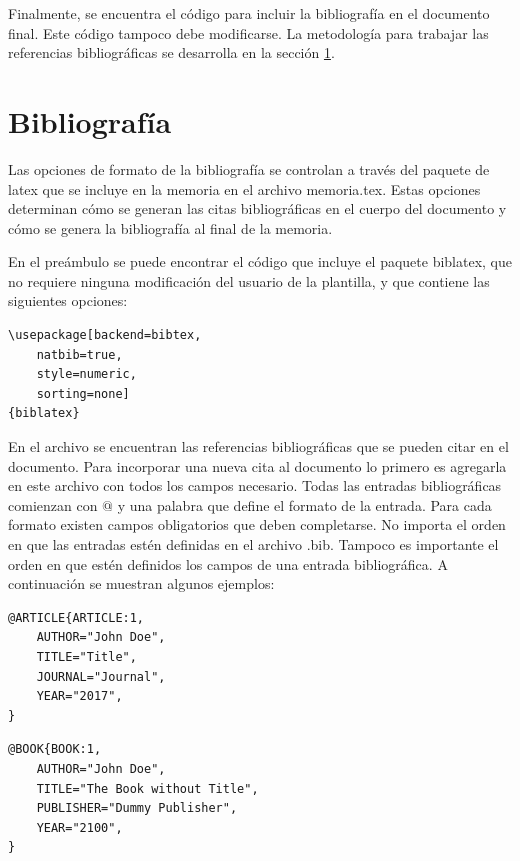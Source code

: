 Finalmente, se encuentra el código para incluir la bibliografía en el documento final.  Este código tampoco debe modificarse. La metodología para trabajar las referencias bibliográficas se desarrolla en la sección \ref{sec:biblio}.

\section{Bibliografía}
\label{sec:biblio}

Las opciones de formato de la bibliografía se controlan a través del paquete de latex  que se incluye en la memoria en el archivo memoria.tex.  Estas opciones determinan cómo se generan las citas bibliográficas en el cuerpo del documento y cómo se genera la bibliografía al final de la memoria.

En el preámbulo se puede encontrar el código que incluye el paquete biblatex, que no requiere ninguna modificación del usuario de la plantilla, y que contiene las siguientes opciones:

\begin{lstlisting}
\usepackage[backend=bibtex,
	natbib=true, 
	style=numeric, 
	sorting=none]
{biblatex}
\end{lstlisting}

En el archivo  se encuentran las referencias bibliográficas que se pueden citar en el documento.  Para incorporar una nueva cita al documento lo primero es agregarla en este archivo con todos los campos necesario.  Todas las entradas bibliográficas comienzan con $@$ y una palabra que define el formato de la entrada.  Para cada formato existen campos obligatorios que deben completarse. No importa el orden en que las entradas estén definidas en el archivo .bib.  Tampoco es importante el orden en que estén definidos los campos de una entrada bibliográfica. A continuación se muestran algunos ejemplos:

\begin{lstlisting}
@ARTICLE{ARTICLE:1,
    AUTHOR="John Doe",
    TITLE="Title",
    JOURNAL="Journal",
    YEAR="2017",
}
\end{lstlisting}


\begin{lstlisting}
@BOOK{BOOK:1,
    AUTHOR="John Doe",
    TITLE="The Book without Title",
    PUBLISHER="Dummy Publisher",
    YEAR="2100",
}
\end{lstlisting}


